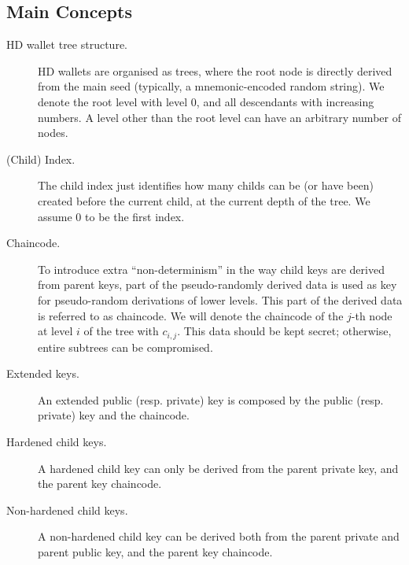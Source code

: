 
\subsection{Main Concepts}
\label{ssec:mainhdconcepts}

\begin{description}
\item[HD wallet tree structure.] HD wallets are organised as trees, where the
  root node is directly derived from the main seed (typically, a mnemonic-encoded
  random string). We denote the root level with level $0$, and all descendants
  with increasing numbers. A level other than the root level can have an
  arbitrary number of nodes.
\item[(Child) Index.] The child index just identifies how many childs can be (or
  have been) created before the current child, at the current depth of the tree.
  We assume $0$ to be the first index.
\item[Chaincode.] To introduce extra ``non-determinism'' in the way child keys
  are derived from parent keys, part of the pseudo-randomly derived data is
  used as key for pseudo-random derivations of lower levels. This part of the
  derived data is referred to as chaincode. We will denote the chaincode of the
  $j$-th node at level $i$ of the tree with $c_{i,j}$. This data should be kept
  secret; otherwise, entire subtrees can be compromised.
\item[Extended keys.] An extended public (resp. private) key is composed by the
  public (resp. private) key and the chaincode.  
\item[Hardened child keys.] A hardened child key can only be derived from the
  parent private key, and the parent key chaincode. 
\item[Non-hardened child keys.] A non-hardened child key can be derived both
  from the parent private and parent public key, and the parent key chaincode.
\end{description}

